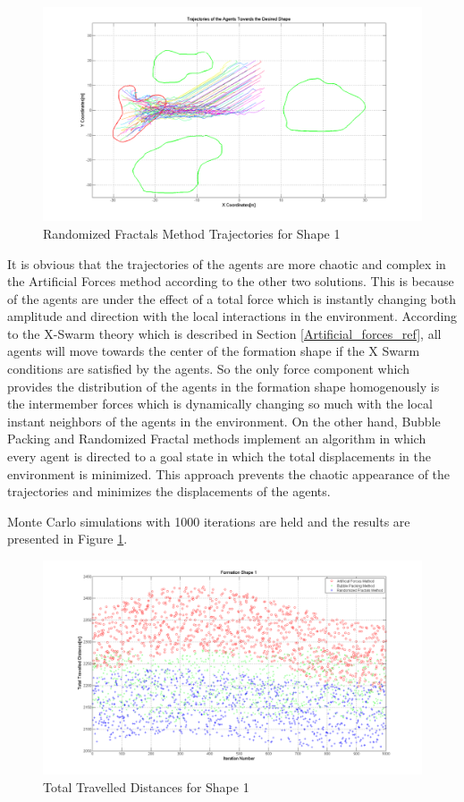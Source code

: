 \begin{figure}[H]
\caption{Randomized Fractals Method Trajectories for Shape 1}
\centerline{\includegraphics[scale = 0.35]{Randomized_Trajectories_1}}
\end{figure} 	
			
It is obvious that the trajectories of the agents are more chaotic and complex in the Artificial Forces method according to the other two solutions. This is because of the agents are under the effect of a total force which is instantly changing both amplitude and direction with the local interactions in the environment. According to the X-Swarm theory which is described in Section \ref{Artificial_forces_ref}, all agents will move towards the center of the formation shape if the X Swarm conditions are satisfied by the agents. So the only force component which provides the distribution of the agents in the formation shape homogenously is the intermember forces which is dynamically changing so much with the local instant neighbors of the agents in the environment. On the other hand, Bubble Packing and Randomized Fractal methods implement an algorithm in which every agent is directed to a goal state in which the total displacements in the environment is minimized. This approach prevents the chaotic appearance of the trajectories and minimizes the displacements of the agents.

Monte Carlo simulations with 1000 iterations are held and the results are presented in Figure \ref{total_disp_1}. 
		
\begin{figure}[H]
\caption{Total Travelled Distances for Shape 1} \label{total_disp_1}
\centerline{\includegraphics[scale = 0.35]{Total_Energy_Shape_1}}
\end{figure} 	
				
